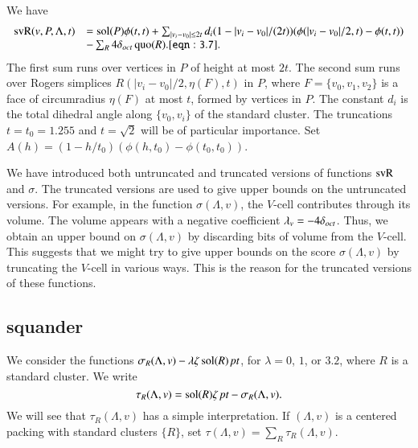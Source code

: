 We have
    \begin{equation}
    \begin{array}{lll}
    \op{svR}(v,P,\Lambda,t) &=
    \sol(P)\phi(t,t)
    +\sum_{|v_i-v_0|\le 2t} d_i (1-|v_i-v_0|/(2t)) (\phi(|v_i-v_0|/2,t)-
    \phi(t,t)) \\
    &-\sum_{R} 4\doct \quo(R).
    \tlabel{eqn:3.7}
    \end{array}
    \end{equation}
The first sum runs over vertices in $P$ of height at most $2t$.
The second sum runs over Rogers simplices $R(|v_i-v_0|/2,\eta(F),t)$
in $P$, where $F=\{v_0,v_1,v_2\}$ is a face of circumradius
$\eta(F)$ at most $t$, formed by vertices in $P$.  The constant
$d_i$ is the total dihedral angle along $\{v_0,v_i\}$ of the
standard cluster. The truncations $t=t_0=1.255$ and $t=\sqrt2$
will be of particular importance.
    Set $A(h) = (1-h/t_0) (\phi(h,t_0)-\phi(t_0,t_0))$.

\begin{remark}  We have introduced both untruncated and truncated
versions of functions ${\operatorname{svR}}$ and $\sigma$.  The truncated versions
are used to give upper bounds on the untruncated versions.  For
example,  in the function $\sigma(\Lambda,v)$, the $V$-cell contributes
through its volume.  The volume
appears with a negative coefficient 
$\lambda_v=-4\delta_{oct}$.  Thus, we obtain an
upper bound on $\sigma(\Lambda,v)$ by discarding bits of volume from the
$V$-cell.   This suggests that we might try to give upper bounds
on the score $\sigma(\Lambda,v)$ by truncating the $V$-cell in various
ways. This is the reason for the truncated versions of these
functions.
\end{remark}




\subsection{squander}%



We consider the functions
    $\sigma_R(\Lambda,v)-\lambda\zeta\operatorname{sol}(R)\,\hbox{\it pt}$,
for $\lambda=0$, $1$, or $3.2$, where $R$ is a standard cluster.
We write
    $$
    \tau_R(\Lambda,v) = \operatorname{sol}(R)\zeta\,\hbox{\it pt} -
    \sigma_R(\Lambda,v).
    $$
We will see that $\tau_R(\Lambda,v)$ has a simple interpretation.  If $(\Lambda,v)$
is a centered packing with standard clusters $\{R\}$, set $\tau(\Lambda,v)
= \sum_{R}\tau_R(\Lambda,v)$.
\smallskip



